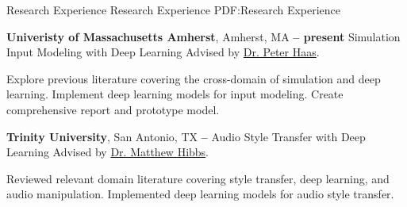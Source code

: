 \Section
{Research Experience}
{Research Experience}
{PDF:Research Experience}

\Entry
\textbf{Univeristy of Massachusetts Amherst},
Amherst, MA
\dotfill
\textbf{ -- present}
\SubEntry
\Gap
Simulation Input Modeling with Deep Learning
\Gap
Advised by \href{https://people.cs.umass.edu/~phaas/}{Dr. Peter Haas}.
\begin{Detail}
    \SubBulletItem
    Explore previous literature covering the cross-domain of simulation and deep learning.
    \SubBulletItem
    Implement deep learning models for input modeling.
    \SubBulletItem
    Create comprehensive report and prototype model.
\end{Detail}

\BigGap
\Entry
\textbf{Trinity University},
San Antonio, TX
\dotfill
\textbf{ -- }
\SubEntry
\Gap
Audio Style Transfer with Deep Learning
\Gap
Advised by \href{http://www.cs.trinity.edu/~mhibbs/}{Dr. Matthew Hibbs}.
\begin{Detail}
    \SubBulletItem
    Reviewed relevant domain literature covering style transfer, deep learning, and audio manipulation.
    \SubBulletItem
    Implemented deep learning models for audio style transfer.
\end{Detail}
